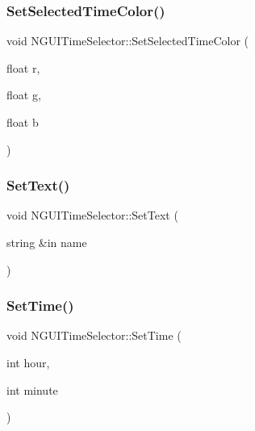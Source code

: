 \hypertarget{class_n_g_u_i_time_selector_aa24a1c2febab8eaa85f97bd22c95b615}{}\label{class_n_g_u_i_time_selector_aa24a1c2febab8eaa85f97bd22c95b615} 
\subsubsection{\texorpdfstring{Set\+Selected\+Time\+Color()}{SetSelectedTimeColor()}}
{\footnotesize\ttfamily void N\+G\+U\+I\+Time\+Selector\+::\+Set\+Selected\+Time\+Color (\begin{DoxyParamCaption}\item[{float}]{r,  }\item[{float}]{g,  }\item[{float}]{b }\end{DoxyParamCaption})}

\hypertarget{class_n_g_u_i_time_selector_a4551bd7323a996114fa3e3a233f1ea36}{}\label{class_n_g_u_i_time_selector_a4551bd7323a996114fa3e3a233f1ea36} 
\subsubsection{\texorpdfstring{Set\+Text()}{SetText()}}
{\footnotesize\ttfamily void N\+G\+U\+I\+Time\+Selector\+::\+Set\+Text (\begin{DoxyParamCaption}\item[{string \&in}]{name }\end{DoxyParamCaption})}

\hypertarget{class_n_g_u_i_time_selector_a5864d1d540ed06dcf3acaf31b5ad41dd}{}\label{class_n_g_u_i_time_selector_a5864d1d540ed06dcf3acaf31b5ad41dd} 
\subsubsection{\texorpdfstring{Set\+Time()}{SetTime()}}
{\footnotesize\ttfamily void N\+G\+U\+I\+Time\+Selector\+::\+Set\+Time (\begin{DoxyParamCaption}\item[{int}]{hour,  }\item[{int}]{minute }\end{DoxyParamCaption})}

